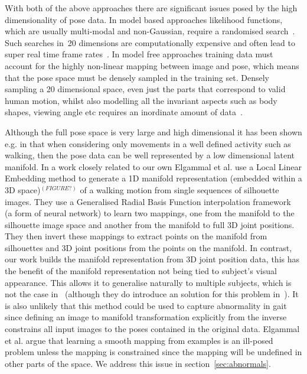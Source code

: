 \documentclass[11pt]{article} %
\begin{document}
With both of the above approaches there are significant issues posed by the high dimensionality of pose data. In model based approaches likelihood functions, which are usually multi-modal and non-Gaussian, require a randomised search~\cite{Sminchisescu2003}. Such searches in~20 dimensions are computationally expensive and often lead to super real time frame rates~\cite{Hen2009}. In model free approaches training data must account for the highly non-linear mapping between image and pose, which means that the pose space must be densely sampled in the training set. Densely sampling a 20 dimensional space, even just the parts that correspond to valid human motion, whilst also modelling all the invariant aspects such as body shapes, viewing angle etc requires an inordinate amount of data~\cite{Hen2009,Agarwal2006}.%

Although the full pose space is very large and high dimensional it has been shown e.g. in \cite{Brand1999,Elgammal2004} that when considering only movements in a well defined activity such as walking, then the pose data can be well represented by a low dimensional latent manifold. In a work closely related to our own Elgammal et al. \cite{Elgammal2004} use a Local Linear Embedding method to generate a 1D manifold representation (embedded within a 3D space)$^{(FIGURE?)}$ of a walking motion from single sequences of silhouette images. They use a Generalised Radial Basis Function interpolation framework~\cite{Poggio1990} (a form of neural network) to learn two mappings, one from the manifold to the silhouette image space and another from the manifold to full 3D joint positions. They then invert these mappings to extract points on the manifold from silhouettes and 3D joint positions from the points on the manifold. In contrast, our work builds the manifold representation from 3D joint position data, this has the benefit of the manifold representation not being tied to subject's visual appearance. This allows it to generalise naturally to multiple subjects, which is not the case in~\cite{Elgammal2004} (although they do introduce an solution for this problem in~\cite{Elgammal2004b}). It is also unlikely that this method could be used to capture abnormality in gait since defining an image to manifold transformation explicitly from the inverse constrains all input images to the poses contained in the original data. Elgammal et al. argue that learning a smooth mapping from examples is an ill-posed problem unless the mapping is constrained since the mapping will be undefined in other parts of the space. We address this issue in section~\ref{sec:abnormals}.
\end{document}
